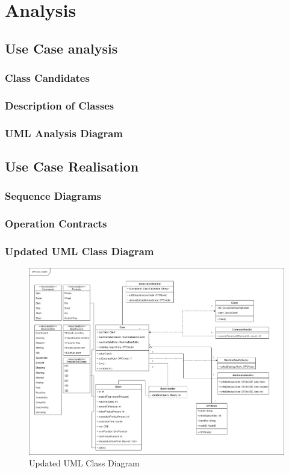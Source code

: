 \section{Analysis}

\subsection{Use Case analysis}

\subsubsection{Class Candidates}

\subsubsection{Description of Classes}

\subsubsection{UML Analysis Diagram}

\subsection{Use Case Realisation}

\subsubsection{Sequence Diagrams}

\subsubsection{Operation Contracts}

\subsubsection{Updated UML Class Diagram}
\begin{figure}[ht]
\centering 
\includegraphics[scale=0.3]{images/diagrams/updated_UML_Class_Diagram.drawio.png}
\caption{Updated UML Class Diagram}
\label{figure:updated_UML_class_diagram} 
\end{figure}


